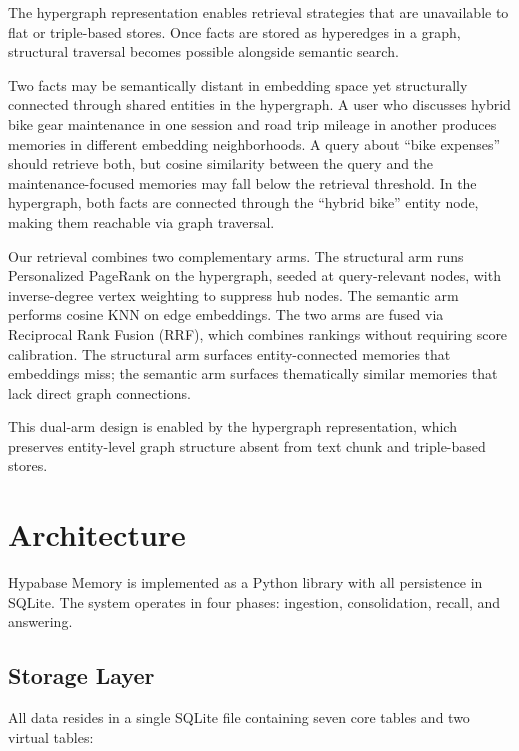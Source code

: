 \documentclass[11pt,a4paper]{article}
\begin{document}
The hypergraph representation enables retrieval strategies that are unavailable to flat or triple-based stores. Once facts are stored as hyperedges in a graph, structural traversal becomes possible alongside semantic search.

Two facts may be semantically distant in embedding space yet structurally connected through shared entities in the hypergraph. A user who discusses hybrid bike gear maintenance in one session and road trip mileage in another produces memories in different embedding neighborhoods. A query about ``bike expenses'' should retrieve both, but cosine similarity between the query and the maintenance-focused memories may fall below the retrieval threshold. In the hypergraph, both facts are connected through the ``hybrid bike'' entity node, making them reachable via graph traversal.

Our retrieval combines two complementary arms. The structural arm runs Personalized PageRank on the hypergraph, seeded at query-relevant nodes, with inverse-degree vertex weighting to suppress hub nodes. The semantic arm performs cosine KNN on edge embeddings. The two arms are fused via Reciprocal Rank Fusion (RRF), which combines rankings without requiring score calibration. The structural arm surfaces entity-connected memories that embeddings miss; the semantic arm surfaces thematically similar memories that lack direct graph connections.

This dual-arm design is enabled by the hypergraph representation, which preserves entity-level graph structure absent from text chunk and triple-based stores.

\section{Architecture}

Hypabase Memory is implemented as a Python library with all persistence in SQLite. The system operates in four phases: ingestion, consolidation, recall, and answering.

\subsection{Storage Layer}

All data resides in a single SQLite file containing seven core tables and two virtual tables:
\end{document}
